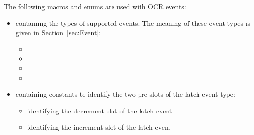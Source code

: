 The following macros and enums are used with OCR events:
\begin{itemize}
\item \hypertarget{type_ocrEventTypes_t}{} containing the types of supported events. The
meaning of these event types is given in Section~\ref{sec:Event}:
  \begin{itemize}
    \item {}
    \item {}
    \item {}
    \item {}
  \end{itemize}
\item {} containing constants to identify the two
pre-slots of the latch event type:
  \begin{itemize}
    \item {} identifying the decrement slot of
      the latch event
    \item {} identifying the increment slot of
      the latch event
  \end{itemize}
\end{itemize}

